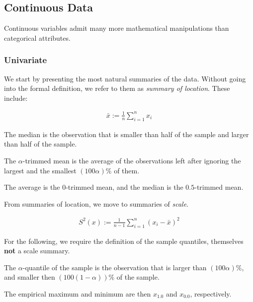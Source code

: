 \documentclass[12pt,a4paper]{report}
\begin{document}
\subsection{Continuous Data}
Continuous variables admit many more mathematical manipulations than categorical attributes. 


\subsubsection{Univariate}

We start by presenting the most natural summaries of the data. Without going into the formal definition, we refer to them as \emph{summary of location}.
These include:

\begin{definition}
\begin{align}
	\bar{x}:= \frac{1}{n}\sum_{i=1}^{n} x_i
\end{align}
\end{definition}

\begin{definition}
The median is the observation that is smaller than half of the sample and larger than half of the sample.
\end{definition}

\begin{definition}
The $\alpha$-trimmed mean is the average of the observations left after ignoring the largest and the smallest $(100\alpha) \%$ of them.
\end{definition}
The \naive average is the $0$-trimmed mean, and the median is the $0.5$-trimmed mean.

From summaries of location, we move to summaries of \emph{scale}. 

\begin{definition}
\begin{align}
	S^2(x):= \frac{1}{n-1} \sum_{i=1}^{n} (x_i-\bar{x})^2
\end{align}
\end{definition}

For the following, we require the definition of the sample quantiles, themselves \textbf{not} a scale summary.

\begin{definition}
The $\alpha$-quantile of the sample is the observation that is larger than $(100\alpha)\%$, and smaller then  $(100(1-\alpha))\%$ of the sample. 
\end{definition}
The empirical maximum and minimum are then $x_{1.0}$ and $x_{0.0}$, respectively.
\end{document}
